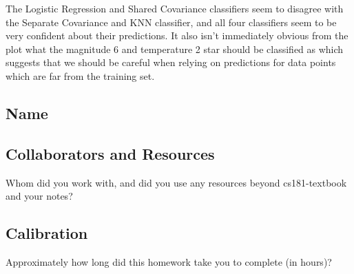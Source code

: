 \documentclass[submit]{harvardml}
\begin{document}
\begin{enumerate}
\begin{center}
\begin{tabular}{|c|c|c|}
        \end{tabular}
        \end{center}
        The Logistic Regression and Shared Covariance classifiers seem to disagree with the Separate Covariance and KNN classifier, and all four classifiers seem to be very confident about their predictions. It also isn't immediately obvious from the plot what the magnitude 6 and temperature 2 star should be classified as which suggests that we should be careful when relying on predictions for data points which are far from the training set.


        \end{enumerate}

\newpage
\subsection*{Name}

\subsection*{Collaborators and Resources}
Whom did you work with, and did you use any resources beyond cs181-textbook and your notes?

\subsection*{Calibration}
Approximately how long did this homework take you to complete (in hours)?
\end{document}
